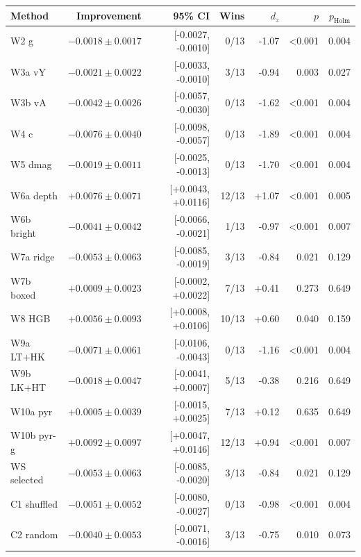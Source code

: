 \begin{tabular}{lrrrrrr}
\toprule
Method & Improvement & 95\% CI & Wins & $d_z$ & $p$ & $p_{\mathrm{Holm}}$ \\
\midrule
W2 g & $-0.0018 \pm 0.0017$ & [-0.0027, -0.0010] & 0/13 & -1.07 & <0.001 & 0.004 \\
W3a vY & $-0.0021 \pm 0.0022$ & [-0.0033, -0.0010] & 3/13 & -0.94 & 0.003 & 0.027 \\
W3b vA & $-0.0042 \pm 0.0026$ & [-0.0057, -0.0030] & 0/13 & -1.62 & <0.001 & 0.004 \\
W4 c & $-0.0076 \pm 0.0040$ & [-0.0098, -0.0057] & 0/13 & -1.89 & <0.001 & 0.004 \\
W5 dmag & $-0.0019 \pm 0.0011$ & [-0.0025, -0.0013] & 0/13 & -1.70 & <0.001 & 0.004 \\
W6a depth & $+0.0076 \pm 0.0071$ & [+0.0043, +0.0116] & 12/13 & +1.07 & <0.001 & 0.005 \\
W6b bright & $-0.0041 \pm 0.0042$ & [-0.0066, -0.0021] & 1/13 & -0.97 & <0.001 & 0.007 \\
W7a ridge & $-0.0053 \pm 0.0063$ & [-0.0085, -0.0019] & 3/13 & -0.84 & 0.021 & 0.129 \\
W7b boxed & $+0.0009 \pm 0.0023$ & [-0.0002, +0.0022] & 7/13 & +0.41 & 0.273 & 0.649 \\
W8 HGB & $+0.0056 \pm 0.0093$ & [+0.0008, +0.0106] & 10/13 & +0.60 & 0.040 & 0.159 \\
W9a LT+HK & $-0.0071 \pm 0.0061$ & [-0.0106, -0.0043] & 0/13 & -1.16 & <0.001 & 0.004 \\
W9b LK+HT & $-0.0018 \pm 0.0047$ & [-0.0041, +0.0007] & 5/13 & -0.38 & 0.216 & 0.649 \\
W10a pyr & $+0.0005 \pm 0.0039$ & [-0.0015, +0.0025] & 7/13 & +0.12 & 0.635 & 0.649 \\
W10b pyr-g & $+0.0092 \pm 0.0097$ & [+0.0047, +0.0146] & 12/13 & +0.94 & <0.001 & 0.007 \\
WS selected & $-0.0053 \pm 0.0063$ & [-0.0085, -0.0020] & 3/13 & -0.84 & 0.021 & 0.129 \\
C1 shuffled & $-0.0051 \pm 0.0052$ & [-0.0080, -0.0027] & 0/13 & -0.98 & <0.001 & 0.004 \\
C2 random & $-0.0040 \pm 0.0053$ & [-0.0071, -0.0016] & 3/13 & -0.75 & 0.010 & 0.073 \\
\bottomrule
\end{tabular}
